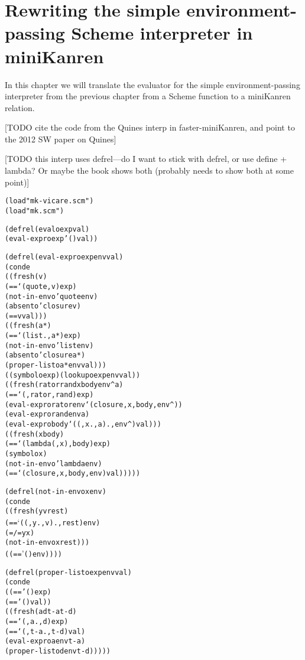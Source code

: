 \documentclass{book}
\begin{document}
\chapter{Rewriting the simple environment-passing Scheme interpreter in miniKanren}%

In this chapter we will translate the evaluator for the simple environment-passing interpreter from the previous chapter from a Scheme function to a miniKanren relation.

[TODO cite the code from the Quines interp in faster-miniKanren, and point to the 2012 SW paper on Quines]

[TODO this interp uses defrel---do I want to stick with defrel, or use define + lambda?  Or maybe the book shows both (probably needs to show both at some point)]

\begin{alltt}
(load "mk-vicare.scm")
(load "mk.scm")
\end{alltt}

\begin{alltt}
(defrel (evalo exp val)
  (eval-expro exp '() val))
\end{alltt}

\begin{alltt}
(defrel (eval-expro exp env val)
  (conde
    ((fresh (v)
       (== `(quote ,v) exp)
       (not-in-envo 'quote env)
       (absento 'closure v)
       (== v val)))
    ((fresh (a*)
       (== `(list . ,a*) exp)
       (not-in-envo 'list env)
       (absento 'closure a*)
       (proper-listo a* env val)))
    ((symbolo exp) (lookupo exp env val))
    ((fresh (rator rand x body env^ a)
       (== `(,rator ,rand) exp)
       (eval-expro rator env `(closure ,x ,body ,env^))
       (eval-expro rand env a)
       (eval-expro body `((,x . ,a) . ,env^) val)))
    ((fresh (x body)
       (== `(lambda (,x) ,body) exp)
       (symbolo x)
       (not-in-envo 'lambda env)
       (== `(closure ,x ,body ,env) val)))))
\end{alltt}
  
\begin{alltt}
(defrel (not-in-envo x env)
  (conde
    ((fresh (y v rest)
       (== `((,y . ,v) . ,rest) env)
       (=/= y x)
       (not-in-envo x rest)))
    ((== '() env))))
\end{alltt}
  
\begin{alltt}
(defrel (proper-listo exp env val)
  (conde
    ((== '() exp)
     (== '() val))
    ((fresh (a d t-a t-d)
       (== `(,a . ,d) exp)
       (== `(,t-a . ,t-d) val)
       (eval-expro a env t-a)
       (proper-listo d env t-d)))))
\end{alltt}
  
\end{document}
